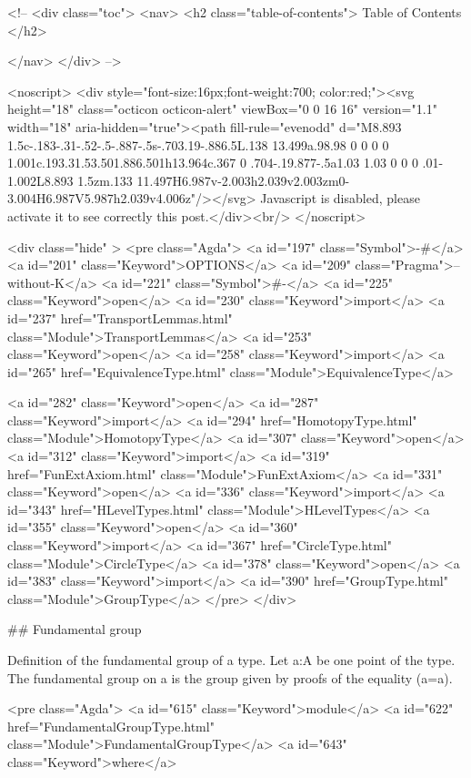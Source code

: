   <!-- 
  <div class="toc">
    <nav>
    <h2 class="table-of-contents"> Table of Contents </h2>
      

    </nav>
  </div>
   -->

  <noscript>
  <div style="font-size:16px;font-weight:700; color:red;"><svg height="18" class="octicon octicon-alert" viewBox="0 0 16 16" version="1.1" width="18" aria-hidden="true"><path fill-rule="evenodd" d="M8.893 1.5c-.183-.31-.52-.5-.887-.5s-.703.19-.886.5L.138 13.499a.98.98 0 0 0 0 1.001c.193.31.53.501.886.501h13.964c.367 0 .704-.19.877-.5a1.03 1.03 0 0 0 .01-1.002L8.893 1.5zm.133 11.497H6.987v-2.003h2.039v2.003zm0-3.004H6.987V5.987h2.039v4.006z"/></svg> Javascript is disabled, please activate it to see correctly this post.</div><br/>
  </noscript>

  <div class="hide" >
<pre class="Agda">
<a id="197" class="Symbol">{-#</a> <a id="201" class="Keyword">OPTIONS</a> <a id="209" class="Pragma">--without-K</a> <a id="221" class="Symbol">#-}</a>
<a id="225" class="Keyword">open</a> <a id="230" class="Keyword">import</a> <a id="237" href="TransportLemmas.html" class="Module">TransportLemmas</a>
<a id="253" class="Keyword">open</a> <a id="258" class="Keyword">import</a> <a id="265" href="EquivalenceType.html" class="Module">EquivalenceType</a>

<a id="282" class="Keyword">open</a> <a id="287" class="Keyword">import</a> <a id="294" href="HomotopyType.html" class="Module">HomotopyType</a>
<a id="307" class="Keyword">open</a> <a id="312" class="Keyword">import</a> <a id="319" href="FunExtAxiom.html" class="Module">FunExtAxiom</a>
<a id="331" class="Keyword">open</a> <a id="336" class="Keyword">import</a> <a id="343" href="HLevelTypes.html" class="Module">HLevelTypes</a>
<a id="355" class="Keyword">open</a> <a id="360" class="Keyword">import</a> <a id="367" href="CircleType.html" class="Module">CircleType</a>
<a id="378" class="Keyword">open</a> <a id="383" class="Keyword">import</a> <a id="390" href="GroupType.html" class="Module">GroupType</a>
</pre>
</div>

## Fundamental group

Definition of the fundamental group of a type.
Let a:A be one point of the type. The fundamental group on a is the
group given by proofs of the equality (a=a).

<pre class="Agda">
<a id="615" class="Keyword">module</a> <a id="622" href="FundamentalGroupType.html" class="Module">FundamentalGroupType</a> <a id="643" class="Keyword">where</a>


